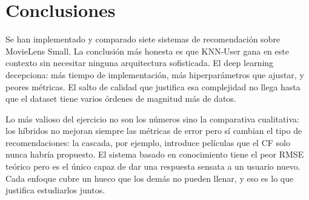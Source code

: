 \section{Conclusiones}

Se han implementado y comparado siete sistemas de recomendación sobre MovieLens Small. La conclusión más honesta es que KNN-User gana en este contexto sin necesitar ninguna arquitectura sofisticada. El deep learning decepciona: más tiempo de implementación, más hiperparámetros que ajustar, y peores métricas. El salto de calidad que justifica esa complejidad no llega hasta que el dataset tiene varios órdenes de magnitud más de datos.

Lo más valioso del ejercicio no son los números sino la comparativa cualitativa: los híbridos no mejoran siempre las métricas de error pero sí cambian el tipo de recomendaciones: la cascada, por ejemplo, introduce películas que el CF solo nunca habría propuesto. El sistema basado en conocimiento tiene el peor RMSE teórico pero es el único capaz de dar una respuesta sensata a un usuario nuevo. Cada enfoque cubre un hueco que los demás no pueden llenar, y eso es lo que justifica estudiarlos juntos.
